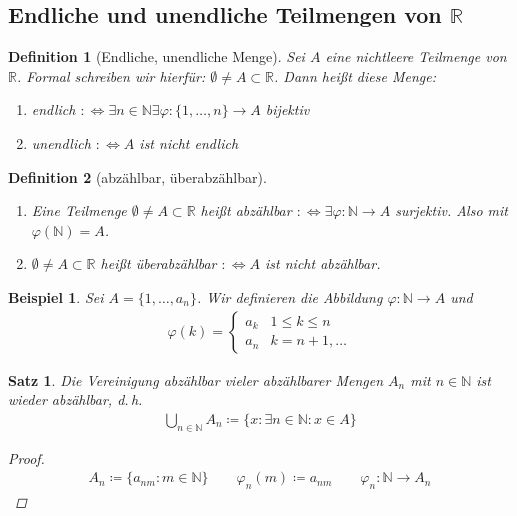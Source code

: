 \documentclass[ngerman,titlepage,twoside, parskip=half*]{scrreprt}
\newcommand*{\N}{\mathbb{N}}
\newcommand*{\R}{\mathbb{R}}
\newcommand*{\perdef}{:\Leftrightarrow}
\theoremstyle{break}
\newtheorem{theorem}{Satz}[section]
\newtheorem{definition}{Definition}[chapter]
\theoremstyle{nonumberbreak}
\newtheorem{beispiel}{Beispiel}
\newtheorem{proof}{Beweis:}
\begin{document}
\subsection{Endliche und unendliche Teilmengen von \texorpdfstring{$\R$}{R}}
\begin{definition}[Endliche, unendliche Menge]
  Sei $A$ eine nichtleere Teilmenge von $\R$. Formal schreiben wir hierfür:
  $\emptyset \neq A \subset \R$. Dann heißt diese Menge:
  \begin{enumerate}
  \item endlich $\perdef \exists n \in \N \exists
    \varphi \colon \{1, \ldots , n\} \rightarrow A$ bijektiv
  \item unendlich $\perdef A$ ist nicht endlich
  \end{enumerate}
\end{definition}

\begin{definition}[abzählbar, überabzählbar]
  \begin{enumerate}
  \item Eine Teilmenge $\emptyset \neq A \subset \R$ heißt abzählbar
    $\perdef \exists \varphi \colon \N \rightarrow A$ surjektiv. Also mit
    $\varphi (\N)=A$.
  \item $\emptyset \neq A \subset \R$ heißt überabzählbar $\perdef A$ ist
    nicht abzählbar.
  \end{enumerate}
\end{definition}

\begin{beispiel}
  Sei $A=\{1,\ldots ,a_n\}$. Wir definieren die Abbildung $\varphi \colon \N
  \rightarrow A$ und
  \begin{gather*}
    \varphi (k) =
    \begin{cases}
      a_k &  1 \leq k \leq n\\
      a_n &  k=n+1,\ldots
    \end{cases}
  \end{gather*}
\end{beispiel}

\begin{theorem}
  Die Vereinigung abzählbar vieler abzählbarer Mengen $A_n$ mit $n \in \N$
  ist wieder abzählbar, d.\,h.
  \begin{gather*}
    \bigcup_{n \in \N} A_n \coloneqq \{x \colon \exists n \in \N \colon x \in A\}
  \end{gather*}
\begin{proof}
  \begin{gather*}
    A_n \coloneqq\{a_{nm}\colon m\in \N\} \qquad \varphi_n(m)\coloneqq a_{nm} \qquad
    \varphi_n\colon\N \rightarrow A_n
  \end{gather*}
\end{proof}
\end{theorem}
\end{document}
